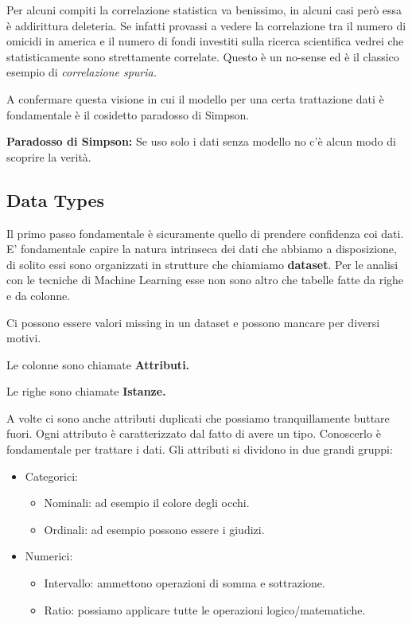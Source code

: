 Per alcuni compiti la correlazione statistica va benissimo, in alcuni casi però essa è addirittura deleteria.  Se infatti provassi a vedere la correlazione tra il numero di omicidi in america e il numero di fondi investiti sulla ricerca scientifica vedrei che statisticamente sono strettamente correlate. Questo è un no-sense ed è il classico esempio di \textit{correlazione spuria.}

A confermare questa visione in cui il modello per una certa trattazione dati è fondamentale è il cosidetto paradosso di Simpson.

\textbf{Paradosso di Simpson:} Se uso solo i dati senza modello no c'è alcun modo di scoprire la verità.


\subsection{Data Types}

Il primo passo fondamentale è sicuramente quello di prendere confidenza coi dati. E' fondamentale capire la natura intrinseca dei dati che abbiamo a disposizione, di solito essi sono organizzati in strutture che chiamiamo \textbf{dataset}. Per le analisi con le tecniche di Machine Learning esse non sono altro che tabelle fatte da righe e da colonne.

Ci possono essere valori missing in un dataset e possono mancare per diversi motivi.

Le colonne sono chiamate \textbf{Attributi.}

Le righe sono chiamate \textbf{Istanze.}

A volte ci sono anche attributi duplicati che possiamo tranquillamente buttare fuori.
Ogni attributo è caratterizzato dal fatto di avere un tipo. Conoscerlo è fondamentale per trattare i dati.
Gli attributi si dividono in due grandi gruppi:
\begin{itemize}
	\item Categorici:
	\begin{itemize}
		\item Nominali: ad esempio il colore degli occhi.
		\item Ordinali: ad esempio possono essere i giudizi.
	\end{itemize}
	\item Numerici:
	\begin{itemize}
		\item Intervallo: ammettono operazioni di somma e sottrazione. 
		\item Ratio: possiamo applicare tutte le operazioni logico/matematiche.
	\end{itemize}
\end{itemize}

